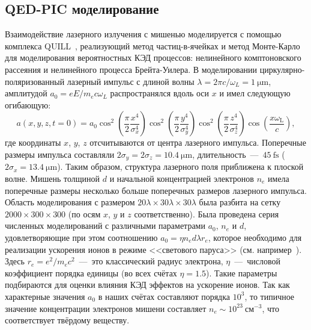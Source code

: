 \subsection{QED-PIC моделирование}
Взаимодействие лазерного излучения с мишенью моделируется с помощью комплекса QUILL~\cite{QUILL}, реализующий метод частиц-в-ячейках и метод Монте-Карло для моделирования вероятностных КЭД процессов: нелинейного комптоновского рассеяния и нелинейного процесса Брейта-Уилера.
В моделировании циркулярно-поляризованный лазерный импульс с длиной волны $\lambda=2\pi c/\omega_{L}=\SI{1}{\um}$, амплитудой $a_{0}=eE/m_{e}c\omega_{L}$ распространялся вдоль оси $x$ и имел следующую огибающую:
\begin{equation}
    a(x,y,z,t=0) =  a_0 \cos^2 \left( \frac{ \pi }{2}   \frac{x^4}{\sigma_x^4 } \right) \cos^2 \left( \frac{ \pi}{2}   \frac{y^4}{\sigma_y ^4 } \right) \cos^2 \left( \frac{ \pi}{2}   \frac{z^4}{\sigma_z ^4 } \right)\cos \left( \frac {x \omega_\mathrm{L} } {c} \right),
\end{equation}  
где координаты $x$, $y$, $z$ отсчитываются от центра лазерного импульса.
Поперечные размеры импульса составляли $2\sigma_y = 2\sigma_z = \SI{10.4}{\um}$, длительность~---~$\SI{45}{\femto\second}$ ($2 \sigma_x = \SI{13.4}{\um}$).
Таким образом, структура лазерного поля приближена к плоской волне.
Мишень толщиной $d$ и начальной концентрацией электронов $n_e$ имела поперечные размеры несколько больше поперечных размеров лазерного импульса.
Область моделирования с размером $20\lambda\times30\lambda\times30\lambda$ была разбита на сетку $2000\times300\times300$ (по осям $x$, $y$ и $z$ соответственно).
Была проведена серия численных моделирований с различными параметрами $a_{0}$, $n_{e}$ и $d$, удовлетворяющие при этом соотношению $a_{0}=\eta n_{e}d\lambda r_{e}$, которое необходимо для реализации ускорения ионов в режиме <<светового паруса>> (см. например~\cite{macchi2013ion}).
Здесь $r_{e}=e^{2}/m_{e}c^{2}$~---~это классический радиус электрона, $\eta$~---~числовой коэффициент порядка единицы (во всех счётах $\eta=1.5$).
Такие параметры подбираются для оценки влияния КЭД эффектов на ускорение ионов.
Так как характерные значения $a_0$ в наших счётах составляют порядка $10^3$, то типичное значение концентрации электронов мишени составляет $n_e\sim10^{23}\ \text{см}^{-3}$, что соответствует твёрдому веществу.



